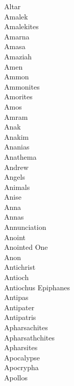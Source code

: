 Altar  \\
Amalek  \\
Amalekites  \\
Amarna  \\
Amasa  \\
Amaziah  \\
Amen  \\
Ammon  \\
Ammonites  \\
Amorites  \\
Amos  \\
Amram  \\
Anak  \\
Anakim  \\
Ananias  \\
Anathema  \\
Andrew  \\
Angels  \\
Animals  \\
Anise  \\
Anna  \\
Annas  \\
Annunciation  \\
Anoint  \\
Anointed One  \\
Anon  \\
Antichrist  \\
Antioch  \\
Antiochus Epiphanes  \\
Antipas  \\
Antipater  \\
Antipatris  \\
Apharsachites  \\
Apharsathchites  \\
Apharsites  \\
Apocalypse  \\
Apocrypha  \\
Apollos  \\
